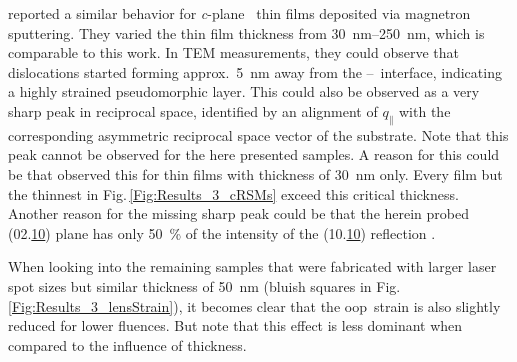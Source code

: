 \textcite{makushko2022} reported a similar behavior for \textit{c}-plane \cro\ thin films deposited via magnetron sputtering.
They varied the thin film thickness from \qtyrange{30}{250}{\nm}, which is comparable to this work.
In \gls{TEM} measurements, they could observe that dislocations started forming approx.\ \qty{5}{\nm} away from the \cro--\alo\ interface, indicating a highly strained pseudomorphic layer.
This could also be observed as a very sharp peak in reciprocal space, identified by an alignment of $q_\parallel$ with the  corresponding asymmetric reciprocal space vector of the substrate.
Note that this peak cannot be observed for the here presented samples.
A reason for this could be that \citeauthor{makushko2022} observed this for thin films with thickness of \qty{30}{\nm} only.
Every film but the thinnest in Fig.\,\ref{Fig:Results_3_cRSMs} exceed this critical thickness.
Another reason for the missing sharp peak could be that the herein probed (02.\underline{10}) plane has only \qty{50}{\percent} of the intensity of the (10.\underline{10}) reflection
    \cite[mp-19399]{MaterialsProject}.

When looking into the remaining samples that were fabricated with larger laser spot sizes but similar thickness of \qty{50}{\nm} (bluish squares in Fig.\,\ref{Fig:Results_3_lensStrain}), it becomes clear that the \gls{oop}\ strain is also slightly reduced for lower fluences.
But note that this effect is less dominant when compared to the influence of thickness.

